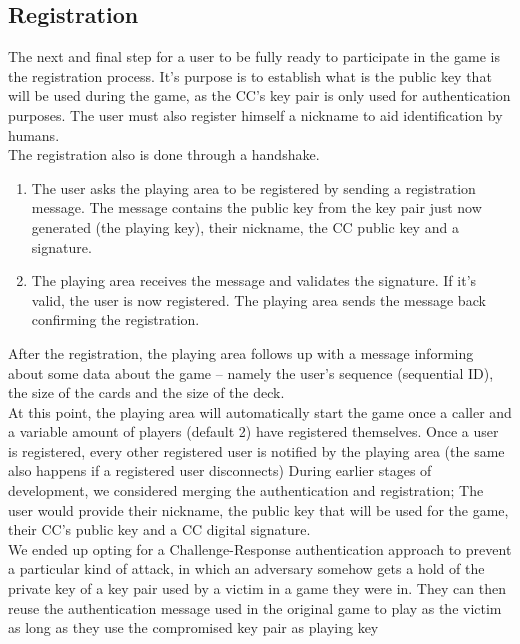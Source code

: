 \documentclass[11pt]{article}
\begin{document}
\subsection{Registration}
The next and final step for a user to be fully ready to participate in the game is the registration process. It’s purpose is to establish what is the public key that will be used during the game, as the CC’s key pair is only used for authentication purposes. The user must also register himself a nickname to aid identification by humans. \\ The registration also is done through a handshake.
\begin{enumerate}
	\item The user asks the playing area to be registered by sending a registration message. The message contains the public key from the key pair just now generated (the playing key), their nickname, the CC public key and a signature.
	\item The playing area receives the message and validates the signature. If it’s valid, the user is now registered. The playing area sends the message back confirming the registration.
\end{enumerate}
After the registration, the playing area follows up with a message informing about some data about the game – namely the user’s sequence (sequential ID), the size of the cards and the size of the deck.
\\At this point, the playing area will automatically start the game once a caller and a variable amount of players (default 2) have registered themselves. Once a user is registered, every other registered user is notified by the playing area (the same also happens if a registered user disconnects)
During earlier stages of development, we considered merging the authentication and registration; The user would provide their nickname, the public key that will be used for the game, their CC’s public key and a CC digital signature.\\
We ended up opting for a Challenge-Response authentication approach to prevent a particular kind of attack, in which an adversary somehow gets a hold of the private key of a key pair used by a victim in a game they were in. They can then reuse the authentication message used in the original game to play as the victim as long as they use the compromised key pair as playing key
\end{document}

